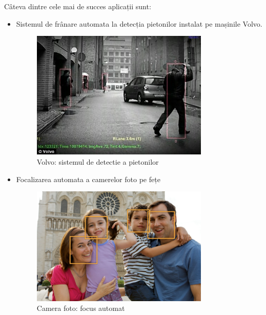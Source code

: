 Câteva dintre cele mai de succes aplicații sunt: 
\begin{itemize}
	\item Sistemul de frânare automata la detecția pietonilor instalat pe mașinile Volvo.\cite{volvo}
	\begin{figure}[H]
		\centering
			\includegraphics[width=0.8\textwidth]{imagini/volvo_pedestrian_detection.jpg}
		\caption{Volvo: sistemul de detectie a pietonilor \cite{VolvoArticle}}
		\label{fig:volvo_pedestrian_detection}
	\end{figure}
	
	\item Focalizarea automata a camerelor foto pe fețe		
	\begin{figure}[H]
		\centering
			\includegraphics[width=0.8\textwidth]{imagini/face_detection_2x.png}
		\caption{Camera foto: focus automat\cite{CanonFaceRecognition}}
		\label{fig:face_detection_2x}
	\end{figure}
	



\end{itemize}
